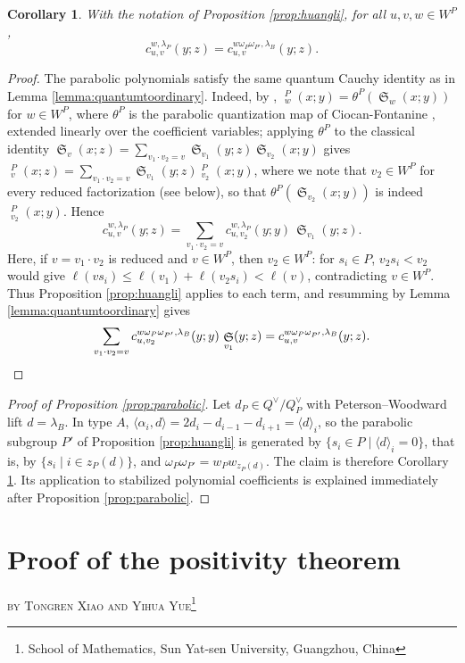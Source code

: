 \documentclass{amsart}
\newtheorem{corollary}[lemma]{Corollary}
\theoremstyle{definition}
\theoremstyle{remark}
\numberwithin{equation}{section}
\DeclareMathOperator{\sch}{\mathfrak{S}}
\DeclareMathOperator{\qsch}{\widetilde{\mathfrak{S}}}
\begin{document}
\begin{corollary} \label{corollary:pwz}
With the notation of Proposition \ref{prop:huangli}, for all $u,v,w\in W^P$,
$$c_{u,v}^{w,\lambda_P}(y;z) = c_{u,v}^{w\omega_P\omega_{P'},\lambda_B}(y;z).$$
\end{corollary}
\begin{proof}
The parabolic polynomials satisfy the same quantum Cauchy identity as in Lemma \ref{lemma:quantumtoordinary}. Indeed, by \cite[Lemma~18]{lam2014quantum}, $\qsch^P_w(x;y)=\theta^P(\sch_w(x;y))$ for $w\in W^P$, where $\theta^P$ is the parabolic quantization map of Ciocan-Fontanine \cite{ciocan1999partial}, extended linearly over the coefficient variables; applying $\theta^P$ to the classical identity $\sch_v(x;z)=\sum_{v_1\cdot v_2=v}\sch_{v_1}(y;z)\sch_{v_2}(x;y)$ gives $\qsch^P_v(x;z)=\sum_{v_1\cdot v_2=v}\sch_{v_1}(y;z)\qsch^P_{v_2}(x;y)$, where we note that $v_2\in W^P$ for every reduced factorization (see below), so that $\theta^P(\sch_{v_2}(x;y))$ is indeed $\qsch^P_{v_2}(x;y)$. Hence
$$c_{u,v}^{w,\lambda_P}(y;z) = \sum_{v_1\cdot v_2=v}c_{u,v_2}^{w,\lambda_P}(y;y)\,\sch_{v_1}(y;z).$$
Here, if $v=v_1\cdot v_2$ is reduced and $v\in W^P$, then $v_2\in W^P$: for $s_i\in P$, $v_2s_i<v_2$ would give $\ell(vs_i)\leq\ell(v_1)+\ell(v_2s_i)<\ell(v)$, contradicting $v\in W^P$. Thus Proposition \ref{prop:huangli} applies to each term, and resumming by Lemma \ref{lemma:quantumtoordinary} gives
$$\sum_{v_1\cdot v_2=v}c_{u,v_2}^{w\omega_P\omega_{P'},\lambda_B}(y;y)\,\sch_{v_1}(y;z) = c_{u,v}^{w\omega_P\omega_{P'},\lambda_B}(y;z).\qedhere$$
\end{proof}

\begin{proof}[Proof of Proposition \ref{prop:parabolic}]
Let $d_P\in Q^\vee/Q^\vee_P$ with Peterson--Woodward lift $d=\lambda_B$. In type $A$, $\langle\alpha_i,d\rangle=2d_i-d_{i-1}-d_{i+1}=\langle d\rangle_i$, so the parabolic subgroup $P'$ of Proposition \ref{prop:huangli} is generated by $\{s_i\in P\mid\langle d\rangle_i=0\}$, that is, by $\{s_i\mid i\in z_P(d)\}$, and $\omega_P\omega_{P'}=w_Pw_{z_P(d)}$. The claim is therefore Corollary \ref{corollary:pwz}. Its application to stabilized polynomial coefficients is explained immediately after Proposition \ref{prop:parabolic}.
\end{proof}

\appendix
\section{Proof of the positivity theorem} \label{appendix:positivity}
\begin{center}
\textsc{by Tongren Xiao and Yihua Yue}\footnote{School of Mathematics, Sun Yat-sen University, Guangzhou, China}
\end{center}
\end{document}
